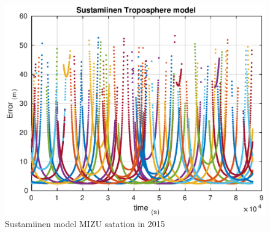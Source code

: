 \documentclass[12pt]{article}
\begin{document}
\begin{figure}[H]
	\centering
    \includegraphics[width=0.5 \textwidth]{img/sus}
    \caption{Sustamiinen model MIZU satation in 2015}
\end{figure}
\end{document}
